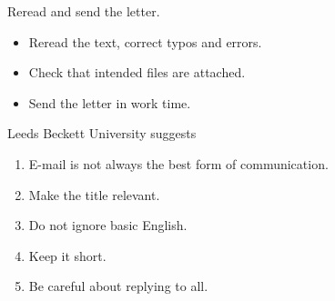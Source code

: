 \documentclass{beamer}
\begin{document}

\begin{frame}{Reread and send the letter.}
  \begin{itemize}
    \item Reread the text, correct typos and errors.
    \item Check that intended files are attached.
    \item Send the letter in work time.
  \end{itemize}
\end{frame}

\begin{frame}{Leeds Beckett University \cite{Beckett} suggests}
  \begin{enumerate}
    \item E-mail is not always the best form of communication.
    \item Make the title relevant.
    \item Do not ignore basic English.
    \item Keep it short.
    \item Be careful about replying to all.
  \end{enumerate}
\end{frame}
\end{document}
